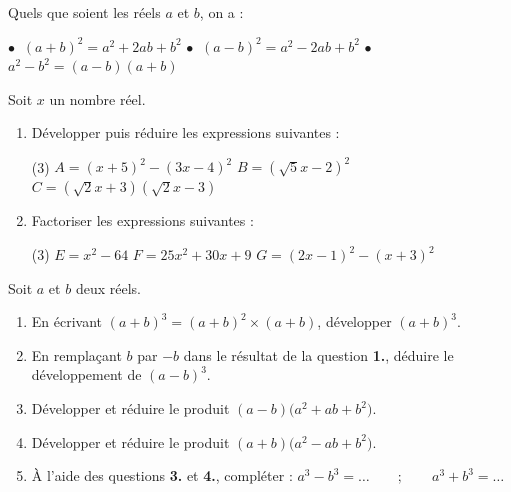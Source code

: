 \documentclass[10pt, a4paper]{article}
\begin{document}
\begin{Propriete}[]
Quels que soient les réels $a$ et $b$, on a :
\vspace{0.2cm}

    $\bullet~$ $(a+b)^2 = a^2 + 2ab + b^2$ \hfill
    $\bullet~$ $(a-b)^2 = a^2 - 2ab + b^2$ \hfill
    $\bullet~$ $a^2 - b^2 = (a-b)(a+b)$
\end{Propriete}

\begin{Application}[][20 min]
Soit $x$ un nombre réel.
\begin{enumerate}
    \item Développer puis réduire les expressions suivantes :
    \begin{tasks}[label=$\bullet$, label-width=5pt, item-indent=15pt](3)
        \task $A = (x + 5)^2  - (3x - 4)^2$
        \task $B = (\sqrt{5}x - 2)^2$
        \task $C = (\sqrt{2}x + 3)(\sqrt{2}x - 3)$
    \end{tasks}

    \item Factoriser les expressions suivantes  :
    \begin{tasks}[label=$\bullet$, label-width=5pt, item-indent=15pt](3)
        \task $E = x^2 - 64$
        \task $F = 25x^2 + 30x + 9$
        \task $G = (2x - 1)^2 - (x + 3)^2$
    \end{tasks}

\end{enumerate}
\end{Application}

\begin{Activite}[][20 min]
Soit $a$ et $b$ deux réels.
\begin{enumerate}
    \item En écrivant $(a+b)^3 = (a+b)^2 \times (a+b)$, développer $(a+b)^3$.
    
    \item En remplaçant $b$ par $-b$ dans le résultat de la question \textbf{1.}, déduire le développement de $(a-b)^3$.
\end{enumerate}

\begin{enumerate}
    \setcounter{enumi}{2}
    \item Développer et réduire le produit $(a-b)\big(a^2 + ab + b^2\big)$.
    
    \item Développer et réduire le produit $(a+b)\big(a^2 - ab + b^2\big)$.
    
    \item À l'aide des questions \textbf{3.} et \textbf{4.}, compléter :
        $a^3 - b^3 = \dots \qquad ; \qquad a^3 + b^3 = \dots$
    
\end{enumerate}
\end{Activite}
\end{document}
